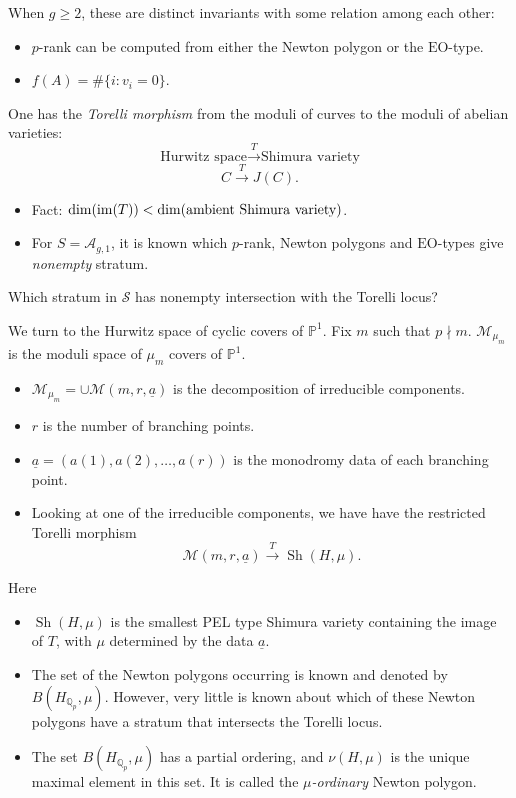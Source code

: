 \documentclass[reqno]{amsart} 
\begin{document}
When $g \geq 2$, these are distinct invariants with some relation among each other:
\begin{itemize}
\item $p$-rank can be computed from either the Newton polygon or the $\mathrm{EO}$-type.
\item $f(A) = \# \{i : v_i = 0\}$.
\end{itemize}

One has the \emph{Torelli morphism}  from the moduli of curves to the moduli of abelian varieties:
\begin{equation*}
  \text{Hurwitz space} \xrightarrow{T} \text{Shimura variety}
\end{equation*}
\begin{equation*}
  C \xrightarrow{T} J(C).
\end{equation*}
\begin{itemize}
\item Fact: $\dim(\operatorname{im}(T)) < \dim(\text{ambient Shimura variety})$.
\item For $S = \mathcal{A}_{g, 1}$, it is known which $p$-rank, Newton polygons and $\mathrm{EO}$-types give \emph{nonempty} stratum.
\end{itemize}
\begin{question}
  Which stratum in $\mathcal{S}$ has nonempty intersection with the Torelli locus?
\end{question}

We turn to the Hurwitz space of cyclic covers of $\mathbb{P}^1$.  Fix $m$ such that $p \nmid m$.  $\mathcal{M}_{\mu_m}$ is the moduli space of $\mu_m$ covers of $\mathbb{P}^1$.
\begin{itemize}
\item $\mathcal{M}_{\mu_m} = \cup \mathcal{M}(m, r, \underline{a})$ is the decomposition of irreducible components.
\item $r$ is the number of branching points.
\item $\underline{a} =(a(1), a(2), \dotsc, a(r))$ is the monodromy data of each branching point.
\item Looking at one of the irreducible components, we have have the restricted Torelli morphism
  \begin{equation*}
    \mathcal{M}(m, r, \underline{a}) \xrightarrow{T} \operatorname{Sh}(H, \mu).
  \end{equation*}
\end{itemize}
Here
\begin{itemize}
\item $\operatorname{Sh}(H, \mu)$ is the smallest PEL type Shimura variety containing the image of $T$, with $\mu$ determined by the data $\underline{a}$.
\item The set of the Newton polygons occurring is known and denoted by $B(H_{\mathbb{Q}_p}, \mu)$.  However, very little is known about which of these Newton polygons have a stratum that intersects the Torelli locus.
\item The set $B(H_{\mathbb{Q}_p}, \mu)$ has a partial ordering, and $\nu(H, \mu)$ is the unique maximal element in this set.  It is called the $\mu$\emph{-ordinary} Newton polygon.
\end{itemize}
\end{document}
